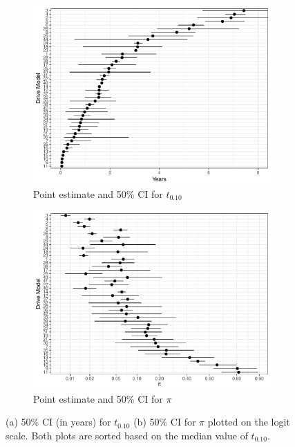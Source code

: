 \documentclass[12pt]{article}
\begin{document}
\begin{figure}[H]
\centering
   \begin{subfigure}[b]{0.80\textwidth}
   \includegraphics[width=1\linewidth]{b10new.pdf}
   \caption{Point estimate and 50\% CI for $t_{0.10}$}
   \label{fig:Ng1} 
\end{subfigure}

\begin{subfigure}[b]{0.80\textwidth}
   \includegraphics[width=1\linewidth]{pinew.pdf}
   \caption{Point estimate and 50\% CI for $\pi$}
   \label{fig:Ng2}
\end{subfigure}

\caption{(a) 50\% CI (in years) for $t_{0.10}$ (b) 50\% CI for $\pi$ plotted on the logit scale.  Both plots are sorted based on the median value of $t_{0.10}$.}
\end{figure}
\end{document}
